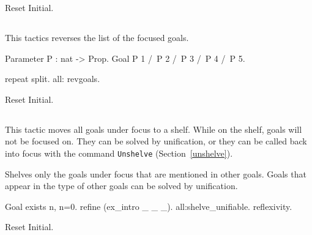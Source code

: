\begin{coq_eval}
Reset Initial.
\end{coq_eval}

\subsection[\tt revgoals]{}

This tactics reverses the list of the focused goals.

\Example
\begin{coq_example*}
Parameter P : nat -> Prop.
Goal P 1 /\ P 2 /\ P 3 /\ P 4 /\ P 5.
\end{coq_example*}
\begin{coq_example}
repeat split.
all: revgoals.
\end{coq_example}

\begin{coq_eval}
Reset Initial.
\end{coq_eval}



\subsection[\tt shelve]{}

This tactic moves all goals under focus to a shelf. While on the shelf, goals
will not be focused on. They can be solved by unification, or they can be called
back into focus with the command {\tt Unshelve} (Section~\ref{unshelve}).

\begin{Variants}
  \item {}

    Shelves only the goals under focus that are mentioned in other goals.
    Goals that appear in the type of other goals can be solved by unification.

\Example
\begin{coq_example}
Goal exists n, n=0.
refine (ex_intro _ _ _).
all:shelve_unifiable.
reflexivity.
\end{coq_example}

\begin{coq_eval}
Reset Initial.
\end{coq_eval}

\end{Variants}

\subsection[\tt Unshelve]{}


